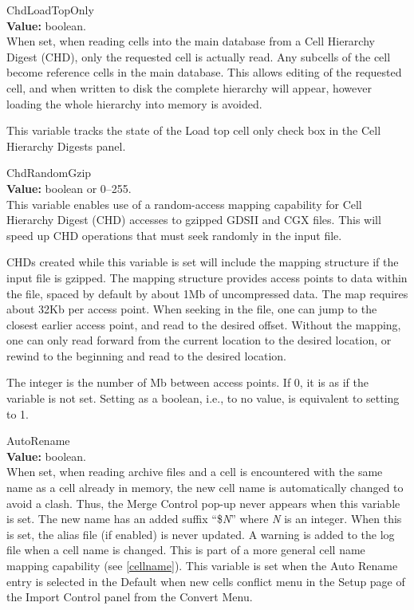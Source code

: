 \begin{description}
\item{\et ChdLoadTopOnly}\\
{\bf Value:} boolean.\\
When set, when reading cells into the main database from a Cell
Hierarchy Digest (CHD), only the requested cell is actually read.  Any
subcells of the cell become reference cells in the main database. 
This allows editing of the requested cell, and when written to disk
the complete hierarchy will appear, however loading the whole
hierarchy into memory is avoided.

This variable tracks the state of the {\cb Load top cell only} check
box in the {\cb Cell Hierarchy Digests} panel.

\item{\et ChdRandomGzip}\\
{\bf Value:} boolean or 0--255.\\
This variable enables use of a random-access mapping capability for
Cell Hierarchy Digest (CHD) accesses to gzipped GDSII and CGX files. 
This will speed up CHD operations that must seek randomly in the input
file.

CHDs created while this variable is set will include the mapping
structure if the input file is gzipped.  The mapping structure
provides access points to data within the file, spaced by default by
about 1Mb of uncompressed data.  The map requires about 32Kb per
access point.  When seeking in the file, one can jump to the closest
earlier access point, and read to the desired offset.  Without the
mapping, one can only read forward from the current location to the
desired location, or rewind to the beginning and read to the desired
location.

The integer is the number of Mb between access points.  If 0, it is as
if the variable is not set.  Setting as a boolean, i.e., to no value,
is equivalent to setting to 1.

\item{\et AutoRename}\\
{\bf Value:} boolean.\\
When set, when reading archive files and a cell is encountered with
the same name as a cell already in memory, the new cell name is
automatically changed to avoid a clash.  Thus, the {\cb Merge Control}
pop-up never appears when this variable is set.  The new name has an
added suffix ``{\vt \$}{\it N}'' where {\it N} is an integer.  When
this is set, the alias file (if enabled) is never updated.  A warning
is added to the log file when a cell name is changed.  This is part of
a more general cell name mapping capability (see \ref{cellname}). 
This variable is set when the {\cb Auto Rename} entry is selected in
the {\cb Default when new cells conflict} menu in the {\cb Setup} page
of the {\cb Import Control} panel from the {\cb Convert Menu}.


\end{description}
